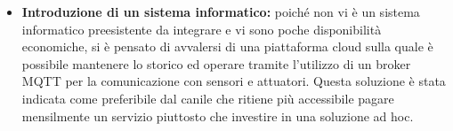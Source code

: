 \begin{itemize}
\item \textbf{Introduzione di un sistema informatico: } poiché non vi è un sistema informatico preesistente da integrare e vi sono poche disponibilità economiche, si è pensato di avvalersi di una piattaforma cloud sulla quale è possibile mantenere lo storico ed operare tramite l'utilizzo di un broker MQTT per la comunicazione  con sensori e attuatori. Questa soluzione è stata indicata come preferibile dal canile che ritiene più accessibile pagare mensilmente un servizio piuttosto che investire in una soluzione ad hoc. 

\end{itemize}





